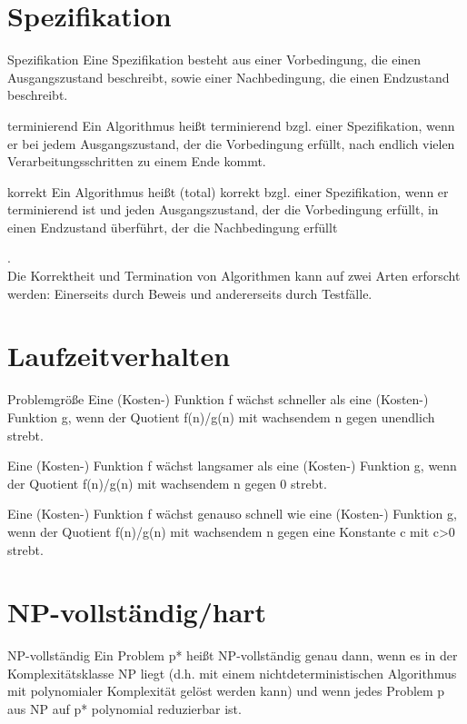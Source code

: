 \section{Spezifikation}
\begin{zitat}{Spezifikation}
 Eine Spezifikation besteht aus einer Vorbedingung, die einen Ausgangszustand beschreibt, sowie einer Nachbedingung, die einen Endzustand beschreibt.
\end{zitat}
\begin{zitat}{terminierend}
 Ein Algorithmus heißt terminierend bzgl. einer Spezifikation, wenn er bei jedem Ausgangszustand, der die Vorbedingung erfüllt, nach endlich vielen Verarbeitungsschritten zu einem Ende kommt.
\end{zitat}
\begin{zitat}{korrekt}
Ein Algorithmus heißt (total) korrekt bzgl. einer Spezifikation, wenn er terminierend ist und jeden Ausgangszustand, der die Vorbedingung erfüllt, in einen Endzustand überführt, der die Nachbedingung erfüllt
\end{zitat}
.\\
Die Korrektheit und Termination von Algorithmen kann auf zwei Arten erforscht werden:
Einerseits durch Beweis und andererseits durch Testfälle.

\section{Laufzeitverhalten}
\begin{zitat}{Problemgröße}
 Eine (Kosten-) Funktion f wächst schneller als eine (Kosten-) Funktion g, wenn der Quotient f(n)/g(n) mit wachsendem n gegen unendlich strebt.

Eine (Kosten-) Funktion f wächst langsamer als eine (Kosten-) Funktion g, wenn der Quotient f(n)/g(n) mit wachsendem n gegen 0 strebt.

Eine (Kosten-) Funktion f wächst genauso schnell wie eine (Kosten-) Funktion g, wenn der Quotient f(n)/g(n) mit wachsendem n gegen eine Konstante c mit c>0 strebt.
\end{zitat}

\section{NP-vollständig/hart}
\begin{zitat}{NP-vollständig}
 Ein Problem p* heißt NP-vollständig genau dann, wenn es in der Komplexitätsklasse NP liegt (d.h. mit einem nichtdeterministischen Algorithmus mit polynomialer Komplexität gelöst werden kann) und wenn jedes Problem p aus NP auf p* polynomial reduzierbar ist.
\end{zitat}
\newpage
